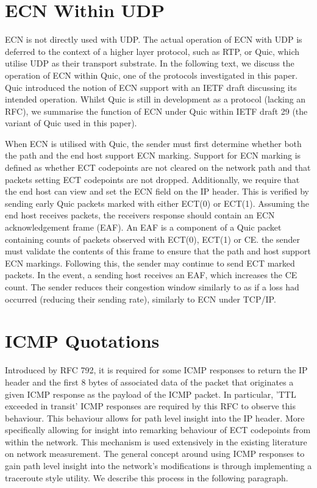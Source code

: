 \documentclass{l4proj}
\begin{document}
\section{ECN Within UDP}

ECN is not directly used with UDP. The actual operation of ECN with UDP is deferred to the context of a higher layer protocol, such as RTP, or Quic, which utilise UDP as their transport substrate. In the following text, we discuss the operation of ECN within Quic, one of the protocols investigated in this paper. Quic introduced the notion of ECN support with an IETF draft discussing its intended operation\citep{johansson_ecn_2017}. Whilst Quic is still in development as a protocol (lacking an RFC), we summarise the function of ECN under Quic within IETF draft 29\cite{thomson_quic_2020} (the variant of Quic used in this paper).


When ECN is utilised with Quic, the sender must first determine whether both the path and the end host support ECN marking. Support for ECN marking is defined as whether ECT codepoints are not cleared on the network path and that packets setting ECT codepoints are not dropped. Additionally, we require that the end host can view and set the ECN field on the IP header. This is verified by sending early Quic packets marked with either ECT(0) or ECT(1). Assuming the end host receives packets, the receivers response should contain an ECN acknowledgement frame (EAF). An EAF is a component of a Quic packet containing counts of packets observed with ECT(0), ECT(1) or CE. the sender must validate the contents of this frame to ensure that the path and host support ECN markings. Following this, the sender may continue to send ECT marked packets. In the event, a sending host receives an EAF, which increases the CE count. The sender reduces their congestion window similarly to as if a loss had occurred (reducing their sending rate), similarly to ECN under TCP/IP\cite{thomson_quic_2020}.

\section{ICMP Quotations}
\label{sec:icmp}

Introduced by RFC 792, it is required for some ICMP responses to return the IP header and the first 8 bytes of associated data of the packet that originates a given ICMP response as the payload of the ICMP packet\citep{rfc792}. In particular, 'TTL exceeded in transit' ICMP responses are required by this RFC to observe this behaviour. This behaviour allows for path level insight into the IP header. More specifically allowing for insight into remarking behaviour of ECT codepoints from within the network. This mechanism is used extensively in the existing literature on network measurement. The general concept around using ICMP responses to gain path level insight into the network's modifications is through implementing a traceroute style utility. We describe this process in the following paragraph.
\end{document}
